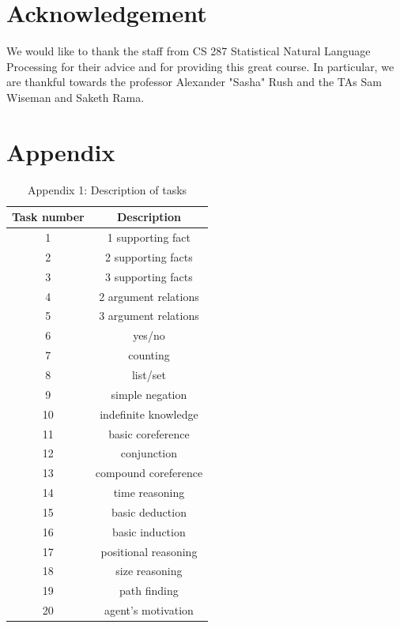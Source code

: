 \documentclass[twoside,11pt]{article}
\begin{document}
\section{Acknowledgement}

We would like to thank the staff from CS 287 Statistical Natural Language Processing for their advice and for providing this great course. In particular, we are thankful towards the professor Alexander "Sasha" Rush and the TAs Sam Wiseman and Saketh Rama.

\vskip 0.2in


\section{Appendix}
\begin{table}[H]
\centering
\label{my-label}
\begin{tabular}{c|c}
Task number & Description          \\ \hline \hline
1           & 1 supporting fact    \\
2           & 2 supporting facts   \\
3           & 3 supporting facts   \\
4           & 2 argument relations \\
5           & 3 argument relations \\
6           & yes/no               \\
7           & counting             \\
8           & list/set             \\
9           & simple negation      \\
10          & indefinite knowledge \\
11          & basic coreference    \\
12          & conjunction          \\
13          & compound coreference \\
14          & time reasoning       \\
15          & basic deduction      \\
16          & basic induction      \\
17          & positional reasoning \\
18          & size reasoning       \\
19          & path finding         \\
20          & agent's motivation  
\end{tabular}
\caption{Appendix 1: Description of tasks}
\end{table}
\end{document}
